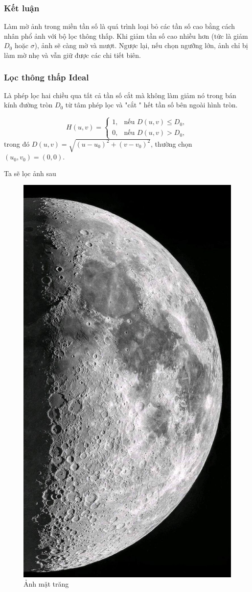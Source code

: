 \documentclass[12pt,a4paper]{report}
\numberwithin{equation}{section}
\theoremstyle{definition} %
\begin{document}
\subsubsection*{Kết luận}
Làm mờ ảnh trong miền tần số là quá trình loại bỏ các tần số cao bằng cách nhân phổ ảnh với bộ lọc thông thấp.  
Khi giảm tần số cao nhiều hơn (tức là giảm $D_0$ hoặc $\sigma$), ảnh sẽ càng mờ và mượt.  
Ngược lại, nếu chọn ngưỡng lớn, ảnh chỉ bị làm mờ nhẹ và vẫn giữ được các chi tiết biên.

\subsubsection{Lọc thông thấp Ideal}
Là phép lọc hai chiều qua tất cả tần số cắt mà không làm giảm nó trong bán kính đường tròn $D_0$ từ tâm phép lọc và "cắt " hết tần số bên ngoài hình tròn.

\begin{equation}
H(u,v) =
\begin{cases}
1, & \text{nếu } D(u,v) \le D_0, \\[4pt]
0, & \text{nếu } D(u,v) > D_0,
\end{cases}
\end{equation}
trong đó $D(u,v) = \sqrt{(u - u_0)^2 + (v - v_0)^2}$, thường chọn $(u_0, v_0) = (0,0).$

Ta sẽ lọc ảnh sau
\begin{figure}[H]
\centering
\includegraphics[width=0.4\linewidth]{img/moon.jpg}
\caption{Ảnh mặt trăng}
\end{figure}
\end{document}
